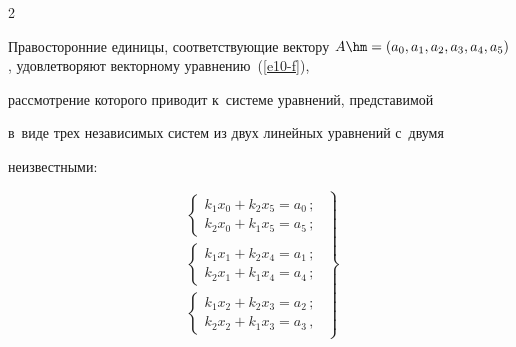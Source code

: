 \begin{multicols}{2}
  


  Правосторонние единицы, соответствующие вектору $A\hm= (a_0, a_1, a_2, 


a_3, a_4, a_5)$, удовлетворяют векторному уравнению~(\ref{e10-f}), 


рассмотрение которого приводит к~системе уравнений, представимой


в~виде трех независимых систем из двух линейных уравнений с~двумя 


неизвестными:


\begin{equation}


\left.


\begin{array}{l}


\left\{


\begin{array}{l}


k_1x_0+k_2x_5=a_0\,;\\[3pt]


k_2x_0+k_1x_5=a_5\,;


\end{array}


\right.\\[12pt]


\left\{


\begin{array}{l}


k_1x_1+k_2x_4=a_1\,;\\[3pt]


k_2x_1+k_1x_4=a_4\,;


\end{array}


\right.\\[12pt]


\left\{


\begin{array}{l}


k_1x_2+k_2x_3=a_2\,;\\[6pt]


k_2x_2+k_1x_3=a_3\,,


\end{array}


\right.


\end{array}


\right\}


\label{e18-f}


\end{equation}


%     



\end{multicols}
